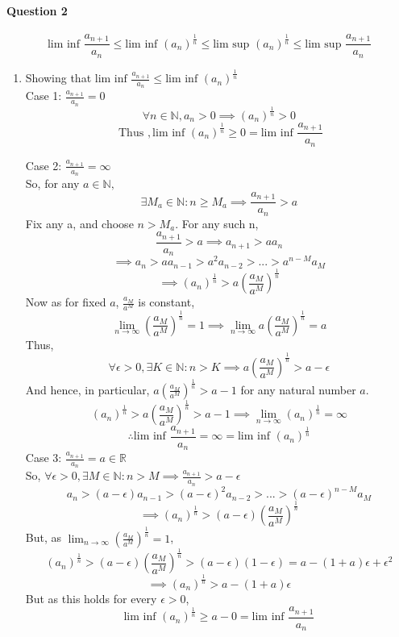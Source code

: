\documentclass[20pt]{extarticle} %
\begin{document}
\paragraph{Question 2}
\[ \text{lim inf } \frac{a_{n+1}}{a_n} \leq \text{lim inf }(a_n)^\frac{1}{n} \leq \text{lim sup }(a_n)^\frac{1}{n} \leq \text{lim sup }\frac{a_{n+1}}{a_n} \]

\begin{enumerate}[label=\Roman*]
	\item Showing that $\text{lim inf } \frac{a_{n+1}}{a_n} \leq \text{lim inf }(a_n)^\frac{1}{n}$\\
		Case 1:  $ \frac{a_{n+1}}{a_n}=0 $
		\[ \forall n \in \mathbb{N}, a_n > 0 \implies (a_n)^ \frac{1}{n}> 0 \]
		\[ \text{ Thus } , \text{lim inf }(a_n)^ \frac{1}{n} \geq 0 = \text{lim inf } \frac{a_{n+1}}{a_n} 	 \]

		Case 2:  $ \frac{a_{n+1}}{a_n}= \infty $\\
		So, for any $ a \in \mathbb{N},$
		\[ \exists M_a \in \mathbb{N}: n\geq	M_a \implies \frac{a_{n+1}}{a_n}> a \]
		Fix any a, and choose $n>M_a$. For any such n,
		\[  \frac{a_{n+1}}{a_n}>a \implies a_{n+1} >aa_n  \]
		\[ \implies a_n>aa_{n-1}> a^2a_{n-2}>...>a^{n-M}a_M \]
		\[ \implies  (a_n)^ \frac{1}{n} > a( \frac{a_M}{a^M} )^	\frac{1}{n} \]
		Now as for fixed $a$, $ \frac{a_M}{a^M} $ is constant,
		\[ \lim_{n \to \infty} (\frac{a_M}{a^M})^{ \frac{1}{n} }=1 \implies \lim_{n \to \infty} a(\frac{a_M}{a^M})^{ \frac{1}{n} }=a\]
		Thus, \[\forall \epsilon >0, \exists K \in \mathbb{N}: n>K \implies a(\frac{a_M}{a^M})^{ \frac{1}{n} }>a- \epsilon \]
		And hence, in particular, $a(\frac{a_M}{a^M})^{ \frac{1}{n} }>a-1$ for any natural number $a$.
		\[ (a_n)^ \frac{1}{n}  > a(\frac{a_M}{a^M})^{ \frac{1}{n} }> a-1 \implies \lim_{n \to \infty} (a_n)^ \frac{1}{n}= \infty  \]
		\[ \therefore  \text{lim inf } \frac{a_{n+1}}{a_n} = \infty=\text{lim inf }(a_n)^\frac{1}{n}\]
		Case 3:  $ \frac{a_{n+1}}{a_n}= a \in \mathbb{R} $\\
		So, $ \forall \epsilon > 0,  \exists M \in \mathbb{N}: n > M \implies \frac{a_{n+1}}{a_n} > a-\epsilon$
		\[ a_n>(a-\epsilon) a_{n-1}>(a-\epsilon)^2 a_{n-2}>...>(a-\epsilon)^{n-M} a_M \]
		\[ \implies (a_n)^ \frac{1}{n}>(a- \epsilon) (\frac{a_M}{a^M})^{ \frac{1}{n} }\]
	But, as $\lim_{n \to \infty} (\frac{a_M}{a^M})^ \frac{1}{n}=1 $,\\
	\[ (a_n)^ \frac{1}{n}>(a- \epsilon) (\frac{a_M}{a^M})^{ \frac{1}{n} }>(a-\epsilon)(1-\epsilon)=a-(1+a)\epsilon+ \epsilon^2 \]
	\[ \implies  (a_n)^ \frac{1}{n}>a-(1+a)\epsilon \]
		But as this holds for every $\epsilon >0$,
		\[ \text{lim inf }(a_n)^ \frac{1}{n} \geq a-0= \text{lim inf } \frac{a_{n+1}}{a_n}  \]


\end{enumerate}
\end{document}
